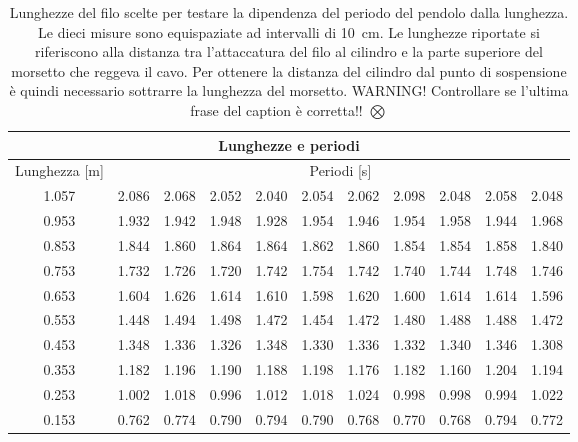 \begin{table}
    \centering
    \begin{tabular}{c c c c c c c c c c c}
        \multicolumn{11}{c}{\textbf{Lunghezze e periodi}} \\
        \toprule
        Lunghezza [m] & \multicolumn{10}{c}{Periodi [s]} \\
        \midrule
        1.057 & 2.086 & 2.068 & 2.052 & 2.040 & 2.054 & 2.062 & 2.098 & 2.048 & 2.058 & 2.048 \\
        0.953 & 1.932 & 1.942 & 1.948 & 1.928 & 1.954 & 1.946 & 1.954 & 1.958 & 1.944 & 1.968 \\
        0.853 & 1.844 & 1.860 & 1.864 & 1.864 & 1.862 & 1.860 & 1.854 & 1.854 & 1.858 & 1.840 \\
        0.753 & 1.732 & 1.726 & 1.720 & 1.742 & 1.754 & 1.742 & 1.740 & 1.744 & 1.748 & 1.746 \\
        0.653 & 1.604 & 1.626 & 1.614 & 1.610 & 1.598 & 1.620 & 1.600 & 1.614 & 1.614 & 1.596 \\
        0.553 & 1.448 & 1.494 & 1.498 & 1.472 & 1.454 & 1.472 & 1.480 & 1.488 & 1.488 & 1.472 \\
        0.453 & 1.348 & 1.336 & 1.326 & 1.348 & 1.330 & 1.336 & 1.332 & 1.340 & 1.346 & 1.308 \\
        0.353 & 1.182 & 1.196 & 1.190 & 1.188 & 1.198 & 1.176 & 1.182 & 1.160 & 1.204 & 1.194 \\
        0.253 & 1.002 & 1.018 & 0.996 & 1.012 & 1.018 & 1.024 & 0.998 & 0.998 & 0.994 & 1.022 \\
        0.153 & 0.762 & 0.774 & 0.790 & 0.794 & 0.790 & 0.768 & 0.770 & 0.768 & 0.794 & 0.772 \\
        \bottomrule
    \end{tabular}
    \caption{Lunghezze del filo scelte per testare la dipendenza del periodo
        del pendolo dalla lunghezza. Le dieci misure sono equispaziate ad intervalli di \SI{10}{\centi\metre}.
        Le lunghezze riportate si riferiscono alla distanza tra l'attaccatura del filo al cilindro e la parte superiore
        del morsetto che reggeva il cavo. Per ottenere la distanza del cilindro dal punto di sospensione è quindi
        necessario sottrarre la lunghezza del morsetto.
        WARNING! Controllare se l'ultima frase del caption è corretta!! $\bigotimes$}
    \label{tab:lunghezze_periodi}
\end{table}
